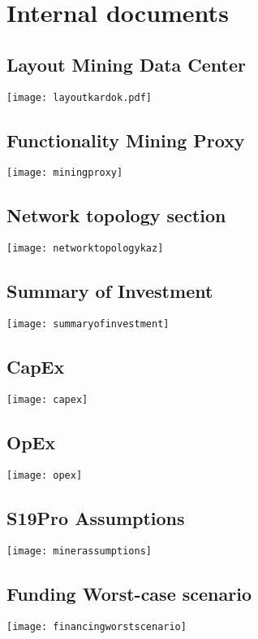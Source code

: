 \section{Internal documents} \label{toc:internedokumente}

\subsection{Layout Mining Data Center} \label{toc:layoutkardok}
\texttt{[image: layoutkardok.pdf]} 

\newpage
\subsection{Functionality Mining Proxy} \label{toc:funktionsweiseminingproxy}
\texttt{[image: miningproxy]}

\subsection{Network topology section} \label{toc:netzwerktopologieausschnitt}
\texttt{[image: networktopologykaz]}

\newpage
\subsection{Summary of Investment} \label{toc:summaryofinvestment}
\texttt{[image: summaryofinvestment]}

\newpage
\subsection{CapEx} \label{toc:capex}
\texttt{[image: capex]}

\newpage
\subsection{OpEx} \label{toc:opex}
\texttt{[image: opex]}

\newpage
\subsection{S19Pro Assumptions} \label{toc:s19proassumptions}
\texttt{[image: minerassumptions]}

\newpage
\subsection{Funding Worst-case scenario} \label{toc:finanzierungworstcase}
\texttt{[image: financingworstscenario]}

